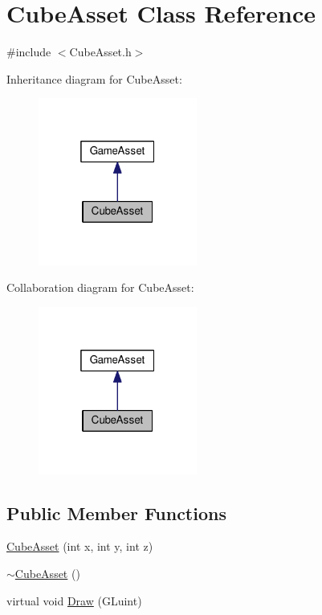 \hypertarget{class_cube_asset}{}\section{Cube\+Asset Class Reference}
\label{class_cube_asset}


{\ttfamily \#include $<$Cube\+Asset.\+h$>$}



Inheritance diagram for Cube\+Asset\+:\nopagebreak
\begin{figure}[H]
\begin{center}
\leavevmode
\includegraphics[width=148pt]{class_cube_asset__inherit__graph}
\end{center}
\end{figure}


Collaboration diagram for Cube\+Asset\+:\nopagebreak
\begin{figure}[H]
\begin{center}
\leavevmode
\includegraphics[width=148pt]{class_cube_asset__coll__graph}
\end{center}
\end{figure}
\subsection*{Public Member Functions}
\begin{DoxyCompactItemize}
\item 
\hyperlink{class_cube_asset_a615ed01cd3abb99e9fe55087a8a4ef0a}{Cube\+Asset} (int x, int y, int z)
\item 
\hyperlink{class_cube_asset_ab3ab9a5da82cbf8537a28652410093b1}{$\sim$\+Cube\+Asset} ()
\item 
virtual void \hyperlink{class_cube_asset_a1af568486056e254ffcf98fd99947bfe}{Draw} (G\+Luint)
\end{DoxyCompactItemize}


